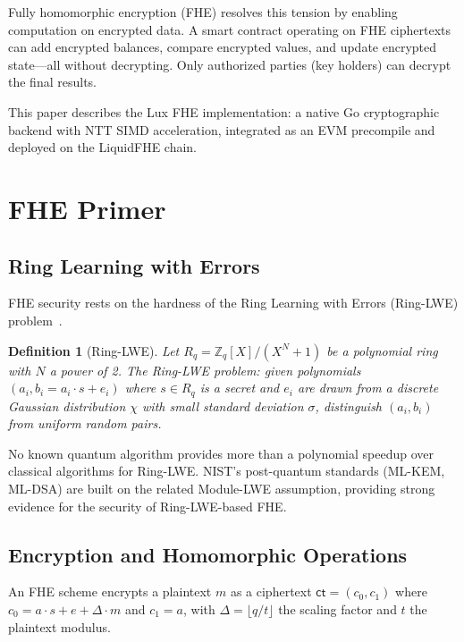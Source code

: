 \documentclass[11pt,a4paper]{article}
\newtheorem{definition}{Definition}[section]
\begin{document}
Fully homomorphic encryption (FHE) resolves this tension by enabling computation on
encrypted data. A smart contract operating on FHE ciphertexts can add encrypted
balances, compare encrypted values, and update encrypted state---all without
decrypting. Only authorized parties (key holders) can decrypt the final results.

This paper describes the Lux FHE implementation: a native Go cryptographic backend
with NTT SIMD acceleration, integrated as an EVM precompile and deployed on the
LiquidFHE chain.

\section{FHE Primer}
\label{sec:fhe-primer}

\subsection{Ring Learning with Errors}

FHE security rests on the hardness of the Ring Learning with Errors
(Ring-LWE) problem~\cite{lyubashevsky2010ideal}.

\begin{definition}[Ring-LWE]
Let $R_q = \mathbb{Z}_q[X]/(X^N + 1)$ be a polynomial ring with $N$ a power of 2.
The Ring-LWE problem: given polynomials $(a_i, b_i = a_i \cdot s + e_i)$ where
$s \in R_q$ is a secret and $e_i$ are drawn from a discrete Gaussian distribution
$\chi$ with small standard deviation $\sigma$, distinguish $(a_i, b_i)$ from uniform
random pairs.
\end{definition}

No known quantum algorithm provides more than a polynomial speedup over classical
algorithms for Ring-LWE. NIST's post-quantum standards (ML-KEM, ML-DSA) are built
on the related Module-LWE assumption, providing strong evidence for the security of
Ring-LWE-based FHE.

\subsection{Encryption and Homomorphic Operations}

An FHE scheme encrypts a plaintext $m$ as a ciphertext $\textsf{ct} = (c_0, c_1)$
where $c_0 = a \cdot s + e + \Delta \cdot m$ and $c_1 = a$, with $\Delta = \lfloor
q/t \rfloor$ the scaling factor and $t$ the plaintext modulus.
\end{document}
